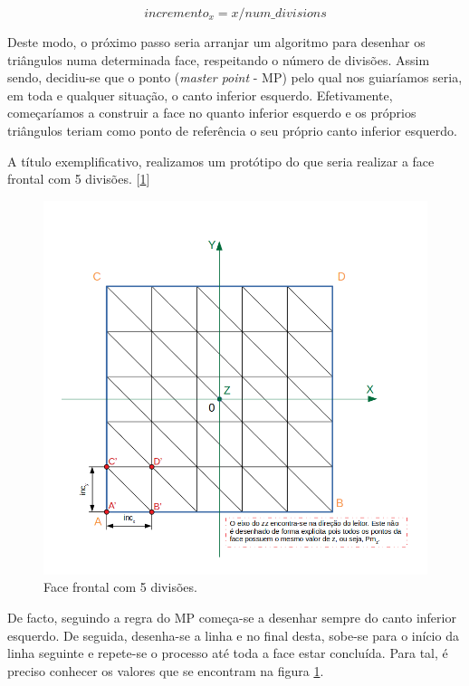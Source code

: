 \documentclass[a4paper]{article}
\begin{document}
\[ incremento_x = x / num\_divisions \]

\hspace{3mm} Deste modo, o próximo passo seria arranjar um algoritmo para desenhar os triângulos numa determinada face, respeitando o número de divisões. Assim sendo, decidiu-se que o ponto (\textit{master point} - MP) pelo qual nos guiaríamos seria, em toda e qualquer situação, o canto inferior esquerdo. Efetivamente, começaríamos a construir a face no quanto inferior esquerdo e os próprios triângulos teriam como ponto de referência o seu próprio canto inferior esquerdo.

\hspace{3mm} A título exemplificativo, realizamos um protótipo do que seria realizar a face frontal com 5 divisões. [\ref{fig:face5}]

\begin{figure}[h!]
\centering
\includegraphics[width=13cm]{./imagens/face.png}
\caption{Face frontal com 5 divisões.}
\label{fig:face5}
\end{figure}

\hspace{3mm} De facto, seguindo a regra do MP começa-se a desenhar sempre do canto inferior esquerdo. De seguida, desenha-se a linha e no final desta, sobe-se para o início da linha seguinte e repete-se o processo até toda a face estar concluída. Para tal, é preciso conhecer os valores que se encontram na figura \ref{fig:face5}.
\end{document}
